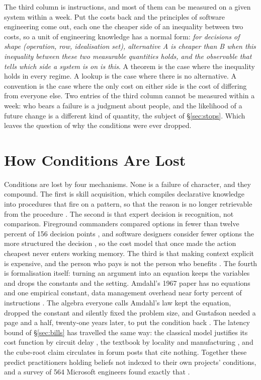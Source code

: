 \documentclass[11pt,oneside]{article}
\theoremstyle{definition}
\theoremstyle{remark}
\begin{document}
The third column is instructions, and most of them can be measured on a given system
within a week. Put the costs back and the principles of software engineering come out,
each one the cheaper side of an inequality between two costs, so a unit of engineering
knowledge has a normal form: \emph{for decisions of shape (operation, row, idealisation
set), alternative A is cheaper than B when this inequality between these two measurable
quantities holds, and the observable that tells which side a system is on is this}. A
theorem is the case where the inequality holds in every regime. A lookup is the case where
there is no alternative. A convention is the case where the only cost on either side is
the cost of differing from everyone else. Two entries of the third column cannot be
measured within a week: who bears a failure is a judgment about people, and the
likelihood of a future change is a different kind of quantity, the subject of
\S\ref{sec:stops}. Which leaves the question of why the conditions were ever
dropped.

\section{How Conditions Are Lost}\label{sec:whykeydropped}
Conditions are lost by four mechanisms. None is a failure of character, and they compound.
The first is skill acquisition, which compiles declarative knowledge into procedures that
fire on a pattern, so that the reason is no longer retrievable from the procedure
\cite{anderson1982}. The second is that expert decision is
recognition, not comparison. Fireground commanders compared options in fewer than twelve
percent of 156 decision points \cite{klein1986}, and software designers consider fewer
options the more structured the decision \cite{zannier2007}, so the cost model that once
made the action cheapest never enters working memory. The third is that making context
explicit is expensive, and the person who pays is not the person who benefits
\cite{shipman1999,grudin1996}. The fourth is formalisation itself: turning an argument into an equation keeps the
variables and drops the constants and the setting. Amdahl's 1967 paper has
no equations and one empirical constant, data management overhead near forty percent of
instructions \cite{amdahl1967}. The algebra everyone calls Amdahl's law kept the equation,
dropped the constant and silently fixed the problem size, and Gustafson needed a page and
a half, twenty-one years later, to put the condition back \cite{gustafson1988}. The latency bound of \S\ref{sec:bills}
has travelled the same way: the classical model justifies its cost function by circuit
delay \cite{aggarwal1987}, the textbook by locality and manufacturing \cite{hpqa}, and the
cube-root claim circulates in forum posts that cite nothing. Together these predict practitioners holding beliefs not indexed to their own projects' conditions,
and a survey of 564 Microsoft engineers found exactly that \cite{devanbu2016}.
\end{document}
